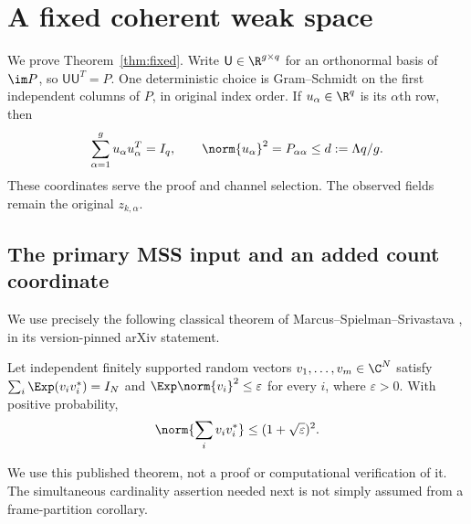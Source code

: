\section{A fixed coherent weak space}\label{sec:fixed}
We prove Theorem~\ref{thm:fixed}. Write $\mathsf U\in\R^{g\times q}$ for an
orthonormal basis of $\im P$, so $\mathsf U\mathsf U^T=P$. One deterministic
choice is Gram--Schmidt on the first independent columns of $P$, in original
index order. If $u_\alpha\in\R^q$ is its $\alpha$th row, then
\begin{equation}\label{eq:frame}
 \sum_{\alpha=1}^g u_\alpha u_\alpha^T=I_q,\qquad
 \norm{u_\alpha}^2=P_{\alpha\alpha}\leq d:=\Lambda q/g.
\end{equation}
These coordinates serve the proof and channel selection. The observed fields
remain the original $z_{k,\alpha}$.

\subsection{The primary MSS input and an added count coordinate}
We use precisely the following classical theorem of
Marcus--Spielman--Srivastava \cite[Theorem 1.4, p.~3]{MSS}, in its version-pinned
arXiv statement.
\begin{theorem}\label{thm:MSS}
Let independent finitely supported random vectors $v_1,\ldots,v_m\in\C^N$
satisfy $\sum_i\Exp(v_iv_i^*)=I_N$ and
$\Exp\norm{v_i}^2\leq\varepsilon$ for every $i$, where $\varepsilon>0$.
With positive probability,
\[
 \norm{\sum_i v_iv_i^*}\leq(1+\sqrt\varepsilon)^2.
\]
\end{theorem}
We use this published theorem, not a proof or computational verification of it.
The simultaneous cardinality assertion needed next is not simply assumed
from a frame-partition corollary.

